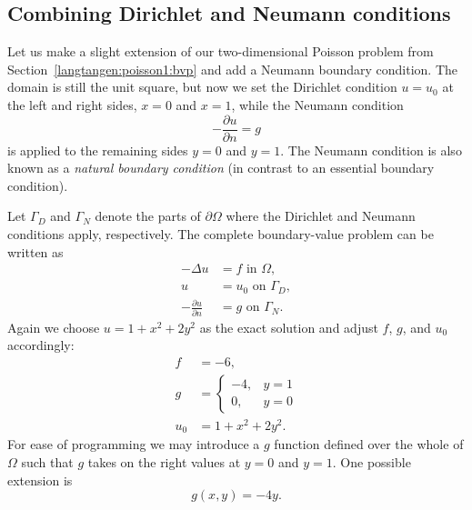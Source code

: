\subsection{Combining Dirichlet and Neumann conditions}
\label{langtangen:poisson1:DN}

Let us make a slight extension of our two-dimensional Poisson problem
from Section~\ref{langtangen:poisson1:bvp} and add a Neumann boundary
condition. The domain is still the unit square, but now we set the
Dirichlet condition $u=u_0$ at the left and right sides, $x=0$ and $x=1$,
while the Neumann condition
\begin{equation}
 - \frac{\partial u}{\partial n} = g
\end{equation}
is applied to the remaining sides $y=0$ and $y=1$.  The Neumann condition
is also known as a \emph{natural boundary condition} (in contrast to an
essential boundary condition).  

Let $\Gamma_D$ and $\Gamma_N$ denote the parts of $\partial\Omega$ where
the Dirichlet and Neumann conditions apply, respectively.  The complete
boundary-value problem can be written as
\begin{align}
  -\Delta u &= f \mbox{ in } \Omega,
\\
  u &= u_0 \mbox{ on } \Gamma_D,
\\
  -\frac{\partial u}{\partial n} &= g \mbox{ on } \Gamma_N.
\end{align}
Again we choose $u=1+x^2 + 2y^2$ as the exact solution and adjust $f$,
$g$, and $u_0$ accordingly:
\begin{align}
f &= -6,
\\
g &= \left\lbrace\begin{array}{ll}
-4, & y=1\\
0,  & y=0
\end{array}\right.
\\
u_0 &= 1 + x^2 + 2y^2.
\end{align}
For ease of programming we may introduce a $g$ function defined over
the whole of $\Omega$ such that $g$ takes on the right values at $y=0$
and $y=1$. One possible extension is
\begin{equation}
   g(x,y) = -4y.
\end{equation}

